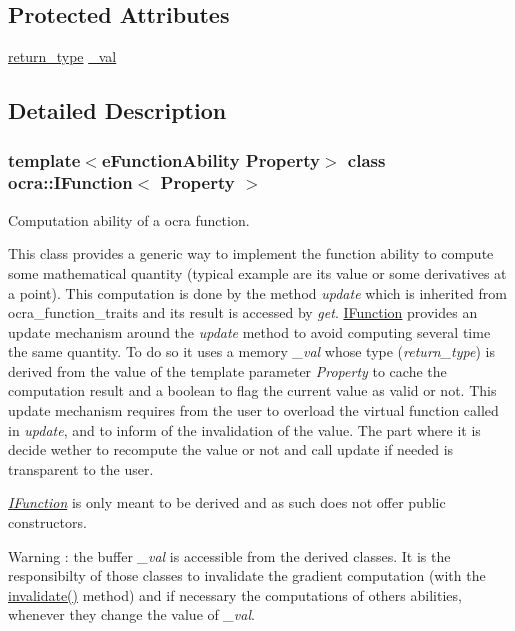 \subsection*{Protected Attributes}
\begin{DoxyCompactItemize}
\item 
\hyperlink{classocra_1_1IFunction_a04d351c2f938d01046328b54fb7e6525}{return\+\_\+type} \hyperlink{classocra_1_1IFunction_a0796c853731943530bc6c772035dca0a}{\+\_\+val}
\end{DoxyCompactItemize}


\subsection{Detailed Description}
\subsubsection*{template$<$e\+Function\+Ability Property$>$\newline
class ocra\+::\+I\+Function$<$ Property $>$}

Computation ability of a ocra function. 

This class provides a generic way to implement the function ability to compute some mathematical quantity (typical example are its value or some derivatives at a point). This computation is done by the method {\itshape update} which is inherited from ocra\+\_\+function\+\_\+traits and its result is accessed by {\itshape get}. \hyperlink{classocra_1_1IFunction}{I\+Function} provides an update mechanism around the {\itshape update} method to avoid computing several time the same quantity. To do so it uses a memory {\itshape \+\_\+val} whose type ({\itshape return\+\_\+type}) is derived from the value of the template parameter {\itshape Property} to cache the computation result and a boolean to flag the current value as valid or not. This update mechanism requires from the user to overload the virtual function called in {\itshape update}, and to inform of the invalidation of the value. The part where it is decide wether to recompute the value or not and call update if needed is transparent to the user.

{\itshape \hyperlink{classocra_1_1IFunction}{I\+Function}} is only meant to be derived and as such does not offer public constructors.

\begin{DoxyWarning}{Warning}
\+: the buffer {\itshape \+\_\+val} is accessible from the derived classes. It is the responsibilty of those classes to invalidate the gradient computation (with the {\ttfamily \hyperlink{classocra_1_1IFunction_ae7cc0015416e006ad5682e7980f9c3d8}{invalidate()}} method) and if necessary the computations of others abilities, whenever they change the value of {\itshape \+\_\+val}. 
\end{DoxyWarning}


